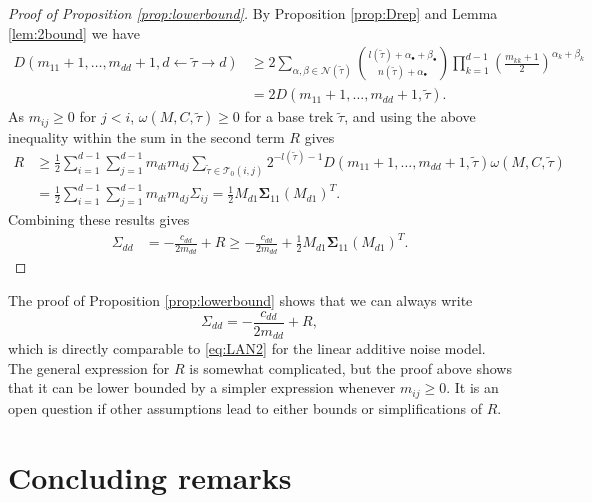 \documentclass[10pt,twoside,a4paper]{amsart}
\newcommand{\bSigma}{\boldsymbol \Sigma}
\begin{document}
\begin{proof}[Proof of Proposition \ref{prop:lowerbound}]
    By Proposition \ref{prop:Drep} and Lemma \ref{lem:2bound} we have 
    \begin{align*}
        D(m_{11} + 1, \ldots, m_{dd} + 1, d \leftarrow \tilde{\tau} \rightarrow d) & \geq 
        2 \sum_{\alpha, \beta \in \mathcal{N}(\tilde{\tau})} 
        {l(\tilde{\tau}) + \alpha_{\bullet} + \beta_{\bullet}
        \choose n(\tilde{\tau}) + \alpha_{\bullet}}
        \prod_{k=1}^{d-1} \left(\frac{m_{kk} + 1}{2}\right)^{\alpha_k + \beta_k} \\
        & = 2  D(m_{11} + 1, \ldots, m_{dd} + 1, \tilde{\tau}).
    \end{align*}
    As $m_{ij} \geq 0$ for $j < i$, $\omega(M, C, \tilde{\tau})  \geq 0$ for a base trek $\tilde{\tau}$, 
    and using the above inequality within the sum in the second term $R$ gives
    \begin{align*}
        R & \geq \frac{1}{2} \sum_{i = 1}^{d - 1}  \sum_{j= 1}^{d-1}  m_{di} m_{dj}
        \sum_{\tilde{\tau} \in \mathcal{T}_0(i, j)}
        2^{-l(\tilde{\tau}) - 1} D(m_{11} + 1, \ldots, m_{dd} + 1, \tilde{\tau}) 
        \omega(M, C, \tilde{\tau}) \\
        & = \frac{1}{2} \sum_{i = 1}^{d - 1}  \sum_{j= 1}^{d-1}  m_{di} m_{dj}
        \Sigma_{ij} = \frac{1}{2} M_{d1} \bSigma_{11} (M_{d1})^T.
    \end{align*}
    Combining these results gives 
    \begin{align*}
        \Sigma_{dd} & = - \frac{c_{dd}}{2m_{dd}} + R
        \geq  - \frac{c_{dd}}{2 m_{dd}}  + 
        \frac{1}{2} M_{d1} \bSigma_{11} (M_{d1})^T.
    \end{align*}
\end{proof}

\begin{rem} The proof of Proposition \ref{prop:lowerbound} shows that we can always write 
    \[
        \Sigma_{dd} = - \frac{c_{dd}}{2 m_{dd}} + R,
    \]
    which is directly comparable to \eqref{eq:LAN2} for the linear additive noise model.
    The general expression for $R$ is somewhat complicated, but the proof above 
    shows that it can be lower bounded by a simpler expression whenever $m_{ij} \geq 0$.
    It is an open question if other assumptions lead to either bounds or simplifications of $R$. 
\end{rem}

\section{Concluding remarks}
\end{document}
